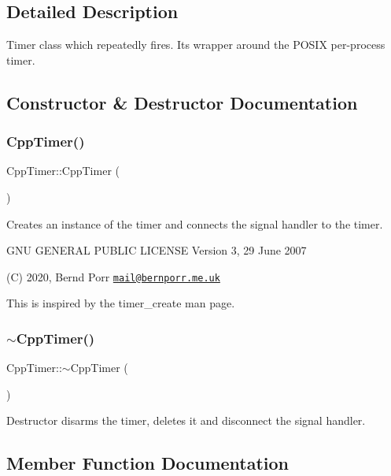 \subsection{Detailed Description}
Timer class which repeatedly fires. It\textquotesingle{}s wrapper around the P\+O\+S\+IX per-\/process timer. 

\subsection{Constructor \& Destructor Documentation}
\mbox{\label{classCppTimer_a327a07c051b9b60fcc61e6fd8f40f381}} 
\subsubsection{\texorpdfstring{Cpp\+Timer()}{CppTimer()}}
{\footnotesize\ttfamily Cpp\+Timer\+::\+Cpp\+Timer (\begin{DoxyParamCaption}{ }\end{DoxyParamCaption})}

Creates an instance of the timer and connects the signal handler to the timer.

G\+NU G\+E\+N\+E\+R\+AL P\+U\+B\+L\+IC L\+I\+C\+E\+N\+SE Version 3, 29 June 2007

(C) 2020, Bernd Porr \href{mailto:mail@bernporr.me.uk}{\tt mail@bernporr.\+me.\+uk}

This is inspired by the timer\+\_\+create man page. \mbox{\label{classCppTimer_a91779a93fce7383a8d832ed481399342}} 
\subsubsection{\texorpdfstring{$\sim$\+Cpp\+Timer()}{~CppTimer()}}
{\footnotesize\ttfamily Cpp\+Timer\+::$\sim$\+Cpp\+Timer (\begin{DoxyParamCaption}{ }\end{DoxyParamCaption})\hspace{0.3cm}{\ttfamily [virtual]}}

Destructor disarms the timer, deletes it and disconnect the signal handler. 

\subsection{Member Function Documentation}
\mbox{\label{classCppTimer_a7cf621a640ea9a1e567ee295c7255b5d}} 
